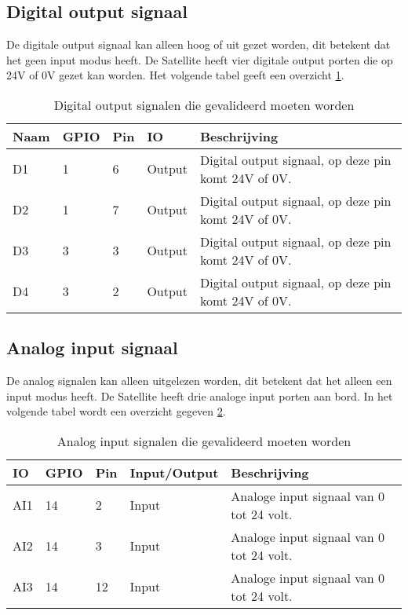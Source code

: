 \subsection{Digital output signaal}
De digitale output signaal kan alleen hoog of uit gezet worden, dit betekent dat het geen input modus heeft. De Satellite heeft vier digitale output porten die op 24V of 0V gezet kan worden. Het volgende tabel geeft een overzicht \ref{tab:hw_val_dio}.
\begin{table}[h!]
	\caption{Digital output signalen die gevalideerd moeten worden}
	\begin{tabular}{llllp{10cm}}
	\toprule
	\textbf{Naam} & \textbf{GPIO} & \textbf{Pin} & \textbf{IO} & \textbf{Beschrijving}				 	\\ \toprule
	D1			& 1			& 6    	& Output	& Digital output signaal, op deze pin komt 24V of 0V. \\
	D2			& 1			& 7    	& Output	& Digital output signaal, op deze pin komt 24V of 0V. \\
	D3			& 3			& 3    	& Output	& Digital output signaal, op deze pin komt 24V of 0V. \\
	D4			& 3			& 2   	& Output	& Digital output signaal, op deze pin komt 24V of 0V. \\ \bottomrule
	\end{tabular}
	\label{tab:hw_val_dio}
\end{table}

\subsection{Analog input signaal} \label{Analog Input Signaal}
De analog signalen kan alleen uitgelezen worden, dit betekent dat het alleen een input modus heeft. De Satellite heeft drie analoge input porten aan bord. In het volgende tabel wordt een overzicht gegeven \ref{tab:hw_val_ai}.
\begin{table}[h!]
	\caption{Analog input signalen die gevalideerd moeten worden}
	\begin{tabular}{llllp{9cm}}
	\toprule
	\textbf{IO} & \textbf{GPIO} & \textbf{Pin} & \textbf{Input/Output} & \textbf{Beschrijving}			\\ \toprule
	AI1			& 14		& 2    	& Input		& Analoge input signaal van 0 tot 24 volt.					\\
	AI2			& 14		& 3    	& Input		& Analoge input signaal van 0 tot 24 volt.					\\
	AI3			& 14		& 12   	& Input		& Analoge input signaal van 0 tot 24 volt.					\\  \bottomrule
	\end{tabular}
	\label{tab:hw_val_ai}
\end{table}

